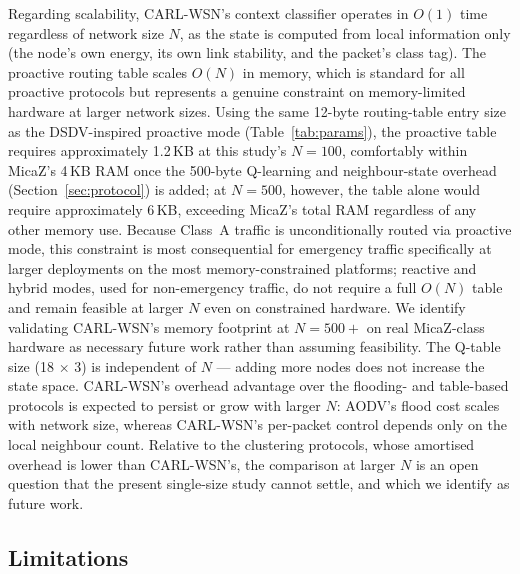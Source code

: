 \documentclass[12pt]{article}
\begin{document}
Regarding scalability, CARL-WSN's context classifier operates in
$O(1)$ time regardless of network size $N$, as the state is
computed from local information only (the node's own energy, its own link stability, and the packet's class tag). The proactive
routing table scales $O(N)$ in memory, which is standard for all
proactive protocols but represents a genuine constraint on
memory-limited hardware at larger network sizes. Using the same
12-byte routing-table entry size as the DSDV-inspired proactive
mode (Table~\ref{tab:params}), the proactive table requires
approximately 1.2\,KB at this study's $N = 100$, comfortably within
MicaZ's 4\,KB RAM once the 500-byte Q-learning and neighbour-state
overhead (Section~\ref{sec:protocol}) is added;
at $N = 500$, however, the table alone would require approximately
6\,KB, exceeding MicaZ's total RAM regardless of any other memory
use. Because Class~A traffic is unconditionally routed via proactive
mode, this constraint is most consequential for emergency traffic
specifically at larger deployments on the most memory-constrained
platforms; reactive and hybrid modes, used for non-emergency
traffic, do not require a full $O(N)$ table and remain feasible at
larger $N$ even on constrained hardware. We identify validating
CARL-WSN's memory footprint at $N = 500{+}$ on real MicaZ-class
hardware as necessary future work rather than assuming feasibility.
The Q-table size (18 $\times$ 3)
is independent of $N$ --- adding more nodes does not increase the
state space. CARL-WSN's overhead advantage over the flooding- and table-based
protocols is expected to persist or grow with larger $N$: AODV's
flood cost scales with network size, whereas CARL-WSN's per-packet
control depends only on the local neighbour count. Relative to the
clustering protocols, whose amortised overhead is lower than
CARL-WSN's, the comparison at larger $N$ is an open question that
the present single-size study cannot settle, and which we identify
as future work.

\subsection{Limitations}
\end{document}
